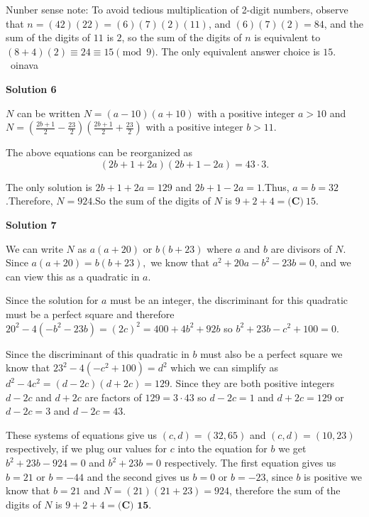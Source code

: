 \begin{enumerate}
 
Nunber sense note: To avoid tedious multiplication of 2-digit numbers, observe that $n = (42)(22) = (6)(7)(2)(11)$, and $(6)(7)(2) = 84$, and the sum of the digits of $11$ is $2$,  so the sum of the digits of $n$ is equivalent to $(8+4)(2) \equiv 24 \equiv 15 \pmod 9$.  The only equivalent answer choice is  $\boxed{15}$. ~oinava

 



\textbf{Solution 6}

$N$ can be written $N = \left( a - 10 \right) \left( a + 10 \right)$ with a positive integer $a > 10$ and $N = \left( \frac{2b + 1}{2} - \frac{23}{2} \right) \left( \frac{2b + 1}{2} + \frac{23}{2} \right)$ with a positive integer $b > 11$.

 The above equations can be reorganized as
 \[ \left( 2b + 1 + 2 a \right) \left( 2 b + 1 - 2 a \right) = 43 \cdot 3 . \]

 The only solution is $2b + 1 + 2a = 129$ and $2b + 1 - 2a = 1$.Thus, $a = b = 32$.Therefore, $N = 924$.So the sum of the digits of $N$ is $9 + 2 + 4 = \boxed{\textbf{(C)}~15}$.

 



\textbf{Solution 7}

We can write $N$ as $a(a+20)$ or $b(b+23)$ where $a$ and $b$ are divisors of $N.$ Since $a(a+20) = b(b+23),$ we know that $a^2 + 20a - b^2 - 23b = 0$, and we can view this as a quadratic in $a.$ 

 Since the solution for $a$ must be an integer, the discriminant for this quadratic must be a perfect square and therefore $20^2 - 4(-b^2 - 23b) = (2c)^2 = 400 + 4b^2 + 92b$ so $b^2 + 23b -c^2 + 100 = 0.$ 

 Since the discriminant of this quadratic in $b$ must also be a perfect square we know that $23^2 - 4(-c^2+100) = d^2$ which we can simplify as $d^2 - 4c^2 = (d-2c)(d+2c) = 129.$ Since they are both positive integers $d - 2c$ and $d + 2c$ are factors of $129 = 3 \cdot 43$ so $d - 2c = 1$ and $d + 2c = 129$ or $d - 2c = 3$ and $d - 2c = 43.$ 

 These systems of equations give us $(c,d) = (32,65)$ and $(c,d) = (10,23)$ respectively, if we plug our values for $c$ into the equation for $b$ we get $b^2 + 23b - 924 = 0$ and $b^2 + 23b = 0$ respectively. The first equation gives us $b = 21$ or $b = -44$ and the second gives us $b = 0$ or $b = -23$, since $b$ is positive we know that $b = 21$ and $N = (21)(21 + 23) = 924$, therefore the sum of the digits of $N$ is $9 + 2 + 4 = \boxed{\textbf{(C) 15}}.$





\end{enumerate}
